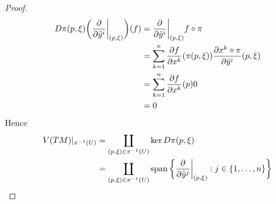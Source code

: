 \documentclass{book}
\begin{document}
\begin{proof}
		\begin{align*}
			D \pi (p, \xi) \bigg( \frac{\partial}{\partial \tilde{y}^i } \bigg|_{(p, \xi)} \bigg) (f)
			& = \frac{\partial}{\partial \tilde{y}^i} \bigg|_{(p, \xi)} f \circ \pi \\
			& = \sum_{k=1}^n \frac{\partial f }{\partial x^k}(\pi (p,\xi)) \frac{\partial x^k \circ \pi }{\partial \tilde{y}^i}(p,\xi) \\
			& = \sum_{k=1}^n \frac{\partial f }{\partial x^k}(p) 0 \\
			& = 0
		\end{align*}
		Hence 
		\begin{align*}
			V(TM)|_{\pi^{-1}(U)}
			& = \coprod_{(p, \xi) \in \pi^{-1}(U)} \ker D \pi(p, \xi) \\
			& = \coprod_{(p, \xi) \in \pi^{-1}(U)} \operatorname{span} \bigg \{ \frac{\partial}{\partial \tilde{y}^j} \bigg|_{(p, \xi)}: j \in \{1, \ldots, n\} \bigg \} 
		\end{align*}
	\end{proof}
\end{document}
